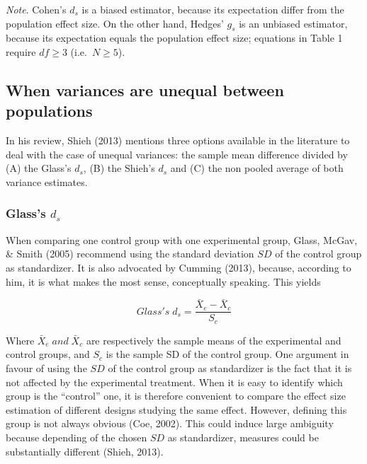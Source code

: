 \documentclass[
  man,floatsintext]{apa6}
\begin{document}
\begin{landscape}
\emph{Note}. Cohen's \(d_s\) is a biased estimator, because its expectation differ from the population effect size. On the other hand, Hedges' \(g_s\) is an unbiased estimator, because its expectation equals the population effect size; equations in Table 1 require \(df \ge 3\) (i.e.~\(N \ge 5\)).

\end{landscape}

\hypertarget{when-variances-are-unequal-between-populations}{%
\subsection{When variances are unequal between populations}\label{when-variances-are-unequal-between-populations}}

In his review, Shieh (2013) mentions three options available in the literature to deal with the case of unequal variances: the sample mean difference divided by (A) the Glass's \(d_s\), (B) the Shieh's \(d_s\) and (C) the non pooled average of both variance estimates.

\hypertarget{glasss-d_s}{%
\subsubsection{\texorpdfstring{Glass's \(d_s\)}{Glass's d\_s}}\label{glasss-d_s}}

When comparing one control group with one experimental group, Glass, McGav, \& Smith (2005) recommend using the standard deviation \(SD\) of the control group as standardizer. It is also advocated by Cumming (2013), because, according to him, it is what makes the most sense, conceptually speaking. This yields

\begin{equation} 
Glass's \; d_s = \frac{\bar{X}_{e} - \bar{X}_{c}}{S_{c}}
\label{eq:Glassds}
\end{equation}

Where \(\bar{X}_{e} \; and \; \bar{X}_{c}\) are respectively the sample means of the experimental and control groups, and \(S_{c}\) is the sample SD of the control group. One argument in favour of using the \(SD\) of the control group as standardizer is the fact that it is not affected by the experimental treatment. When it is easy to identify which group is the \enquote{control} one, it is therefore convenient to compare the effect size estimation of different designs studying the same effect. However, defining this group is not always obvious (Coe, 2002). This could induce large ambiguity because depending of the chosen \(SD\) as standardizer, measures could be substantially diﬀerent (Shieh, 2013).
\end{document}
